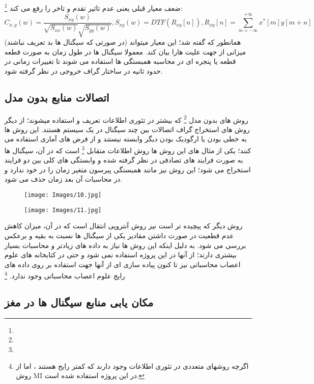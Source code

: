 \documentclass[11pt]{extarticle}
\begin{document}
\begin{itemize}
	\footnote{}
	ضعف معیار قبلی یعنی عدم تاثیر تقدم و تاخر را رفع می کند: 
		$$ C_{x, y} (w) = \frac{S_{xy}(w)}{\sqrt{S_{xx}(w)}\sqrt{S_{yy}(w)}}, S_{xy}(w) = DTF(R_{xy}[n]), R_{xy}[n] = \sum_{m = -\infty}^{+\infty} x^{*}[m]y[m+n] $$
	همانطور که گفته شد؛ این معیار میتواند (در صورتی که سیگنال ها بد تعریف نباشند) میزانی از جهت علیت هارا بیان کند. معمولا سیگنال ها در طول زمان به صورت قطعه قطعه یا پنجره ای در محاسبه همبستگی ها استفاده می شوند تا تغییرات زمانی در حدود ثانیه در ساختار گراف خروجی در نظر گرفته شود.
\end{itemize}

\subsection{اتصالات منابع بدون مدل}

روش های بدون مدل 
\footnote{}
که بیشتر در تئوری اطلاعات تعریف و استفاده میشوند؛ از دیگر روش های استخراج گراف اتصالات بین چند سیگنال در یک سیستم هستند. این روش ها به خطی بودن یا ارگودیک بودن دیگر وابسته نیستند و از فرض های آماری استفاده می کنند؛ یکی از مثال های این روش ها روش اطلاعات متقابل 
\footnote{}
است که در آن، سیگنال ها به صورت فرایند های تصادفی در نظر گرفته شده و وابستگی های کلی بین دو فرایند استخراج می شود؛ این روش نیز مانند همبستگی پیرسون متغیر زمان را در خود ندارد و در محاسبات آن بعد زمان حذف می شود. 

\begin{figure}[h!]
	\centering
	\texttt{[image: Images/10.jpg]}
	\caption{}
	\label{fig:12}
\end{figure}

\begin{figure}[h!]
	\centering
	\texttt{[image: Images/11.jpg]}
	\caption{}
	\label{fig:13}
\end{figure}

روش دیگر که پیچیده تر است نیز روش آنتروپی انتقال است که در آن، میزان کاهش عدم قطعیت در صورت داشتن مقادیر یکی از سیگنال ها نسبت به بقیه و برعکس بررسی می شود. به دلیل اینکه این روش ها نیاز به داده های زیادتر و محاسبات بسیار بیشتری دارند؛ از آنها در این پروژه استفاده نمی شود و حتی در کتابخانه های علوم اعصاب محاسباتی نیز تا کنون پیاده سازی ای از آنها جهت استفاده بر روی داده های رایج علوم اعصاب محاسباتی وجود ندارد.
\footnote{اگرچه روشهای متعددی در تئوری اطلاعات وجود دارند که کمتر رایح هستند
	، اما از روش MI در این پروژه استفاده شده است.
}

\subsection{مکان یابی منابع سیگنال ها در مغز}
\end{document}
